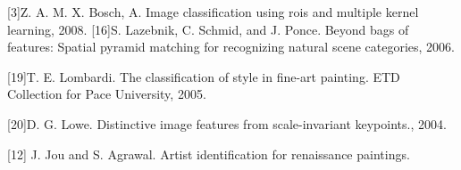 \documentclass{article}
\begin{document}
  
[3]Z. A. M. X. Bosch, A. Image classification using rois and multiple kernel learning, 2008. [16]S. Lazebnik, C. Schmid, and J. Ponce. Beyond bags of features: Spatial pyramid matching for recognizing natural scene categories, 2006.
 
[19]T. E. Lombardi. The classification of style in fine-art painting. ETD Collection for Pace University, 2005. 

[20]D. G. Lowe. Distinctive image features from scale-invariant keypoints., 2004. 

[12] J. Jou and S. Agrawal. Artist identification for renaissance paintings.
  
\end{document}
